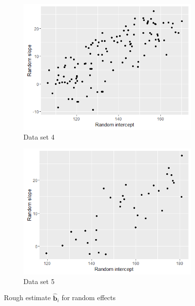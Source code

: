 \begin{figure}[!htb]
\centering
\captionsetup{justification=centering}
\begin{subfigure}[b]{0.4\textwidth}
		\includegraphics[width=\textwidth]{mainmatter/chapter_5_simulation_study/ds_3fused10ppg_randplot.png}
        \caption{\label{fig : ds_3fused10ppg_randplot}Data set 4}
	\end{subfigure}
	\begin{subfigure}[b]{0.4\textwidth}
		\includegraphics[width=\textwidth]{mainmatter/chapter_5_simulation_study/ds_3fused3ppg_randplot.png}
       \caption{\label{fig : ds_3fused3ppg_randplot}Data set 5}
	\end{subfigure}    
    
\caption{\label{fig : ds_3fused10ppg_3fused3ppg}Rough estimate $\boldsymbol{\hat{b}}_i$ for random effects}
\end{figure}

